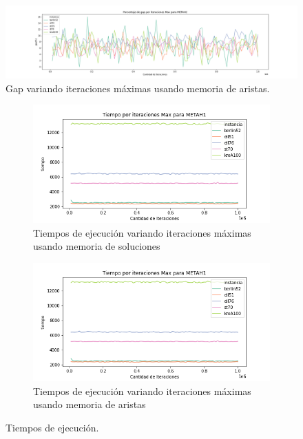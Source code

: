 \documentclass[10pt,a4paper]{article}
\begin{document}
\begin{figure}[h!]
    \centering
    \includegraphics[scale=0.3]{Graphs-metaH/max-iter-gap-METAH2}
    \caption{Gap variando iteraciones máximas usando memoria de aristas.}
    \label{fig:exp_maxiter_gap_metah2}
\end{figure}

\begin{figure}[h!]
    \centering
    \captionsetup{justification=centering}
    \begin{subfigure}{0.45\linewidth}
        \centering
        \includegraphics[scale=0.35]{Graphs-metaH/max-iter-tiempo-METAH1}
        \caption{Tiempos de ejecución variando iteraciones máximas usando memoria de soluciones}
        \label{fig:exp_maxiter_tiempo_metah1}
    \end{subfigure}
    \begin{subfigure}{0.45\linewidth}
        \centering
        \includegraphics[scale=0.35]{Graphs-metaH/max-iter-tiempo-METAH1}
        \caption{Tiempos de ejecución variando iteraciones máximas usando memoria de aristas}
        \label{fig:exp_maxiter_tiempo_metah2}
    \end{subfigure}
    \caption{Tiempos de ejecución.}
\end{figure}
\end{document}
